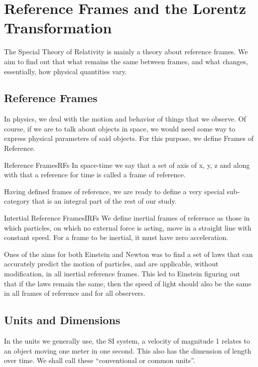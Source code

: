 \documentclass[16pt]{scrartcl}
\numberwithin{equation}{section}
\theoremstyle{plain}
\theoremstyle{definition}
\begin{document}
\section{Reference Frames and the Lorentz Transformation}

The Special Theory of Relativity is mainly a theory about reference frames. We aim to find out that what remains the same between frames, and what changes, essentially, how physical quantities vary.

\subsection{Reference Frames}
\label{sec:RFs}

In physics, we deal with the motion and behavior of things that we observe. Of course, if we are to talk about objects in space, we would need some way to express physical parameters of said objects. For this purpose, we define Frames of Reference.

\begin{defn}{Reference Frames}{RFs}
    In space-time we say that a set of axis of x, y, z and along with that a reference for time is called a frame of reference.
\end{defn}

Having defined frames of reference, we are ready to define a very special sub-category that is an integral part of the rest of our study.

\begin{defn}{Intertial Reference Frames}{IRFs}
    We define inertial frames of reference as those in which particles, on which no external force is acting, move in a straight line with constant speed. For a frame to be inertial, it must have zero acceleration.
\end{defn}

Ones of the aims for both Einstein and Newton was to find a set of laws that can accurately predict the motion of particles, and are applicable, without modification, in all inertial reference frames. This led to Einstein figuring out that if the laws remain the same, then the speed of light should also be the same in all frames of reference and for all observers.

\subsection*{Units and Dimensions}

In the units we generally use, the SI system, a velocity of magnitude 1 relates to an object moving one meter in one second. This also has the dimension of length over time. We shall call these ``conventional or common units''.
\end{document}

